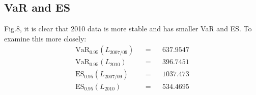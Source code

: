 \documentclass[11pt]{article}
\begin{document}
\vspace{-1em}\subsection{VaR and ES}\vspace{-1em}
Fig.8, it is clear that 2010 data is more stable and has smaller VaR and ES. To examine this more closely:
\begin{align*} 
  &\text{VaR}_{0.95}(L_{2007/09})& &=& &637.9547& \\
  &\text{VaR}_{0.95}(L_{2010})& &=& &396.7451& \\
  &\text{ES}_{0.95}(L_{2007/09})& &=& &1037.473& \\
  &\text{ES}_{0.95}(L_{2010})& &=& &534.4695& \\
\end{align*}
\vspace{-2.5em}
\end{document}
